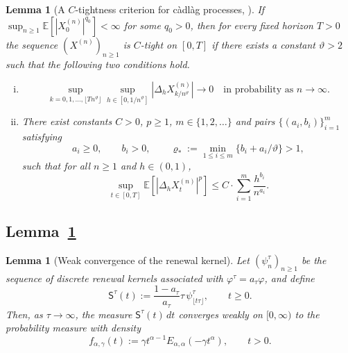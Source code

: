 \documentclass[letterpaper]{article}
\numberwithin{equation}{section}
\newtheorem{lemma}[theorem]{Lemma}
\theoremstyle{definition}
\theoremstyle{remark}
\begin{document}
\begin{lemma}[A $C$-tightness criterion for c\`adl\`ag processes, {\cite[Lemma~3.5]{horst2023convergence}}]
\label{xu2023}
If
$\sup_{n\ge1}\mathbb{E}\left[\left|X_0^{(n)}\right|^{q_0}\right]<\infty$
for some $q_0>0$, then for every fixed horizon $T>0$ the sequence
$\left(X^{(n)}\right)_{n\ge1}$ is $C$-tight on $[0,T]$ if there exists a
constant $\vartheta>2$ such that the following two conditions hold.
\begin{enumerate}[(i)]
  \item
  \[
    \sup_{k=0,1,\ldots,\lfloor Tn^\vartheta\rfloor}\sup_{h\in[0,1/n^\vartheta]}
    \left|\Delta_hX_{k/n^\vartheta}^{(n)}\right|
    \rightarrow 0
    \quad\text{in probability as } n\rightarrow\infty.
  \]
  \item There exist constants $C>0$, $p\ge1$, $m\in\{1,2,\ldots\}$ and pairs
  $\{(a_i,b_i)\}_{i=1}^m$ satisfying
  \[
    a_i\ge0,\qquad b_i>0,\qquad
    \varrho_*:=\min_{1\le i\le m}\{b_i+a_i/\vartheta\}>1,
  \]
  such that for all $n\ge1$ and $h\in(0,1)$,
  \[
    \sup_{t\in[0,T]}\mathbb{E}\left[\left|\Delta_h X_t^{(n)}\right|^p\right]
    \le C\cdot\sum_{i=1}^m\frac{h^{b_i}}{n^{a_i}}.
  \]
\end{enumerate}
\end{lemma}


\subsection{Lemma~\ref{lem:kernel_convergence}}\label{app:kernel_convergence}

\begin{lemma}[Weak convergence of the renewal kernel]
\label{lem:kernel_convergence}
Let $(\psi_n^\tau)_{n\ge1}$ be the sequence of discrete renewal kernels associated
with $\varphi^\tau=a_\tau\varphi$, and define
\[
  \mathsf S^\tau(t)
  :=
  \frac{1-a_\tau}{a_\tau}\tau\,\psi^\tau_{\lfloor t\tau\rfloor},
  \qquad t\ge0.
\]
Then, as $\tau\to\infty$, the measure $\mathsf S^\tau(t)\,dt$ converges weakly on
$[0,\infty)$ to the probability measure with density
\[
  f_{\alpha,\gamma}(t)
  :=
  \gamma t^{\alpha-1}E_{\alpha,\alpha}(-\gamma t^\alpha),
  \qquad t>0.
\]
\end{lemma}
\end{document}
